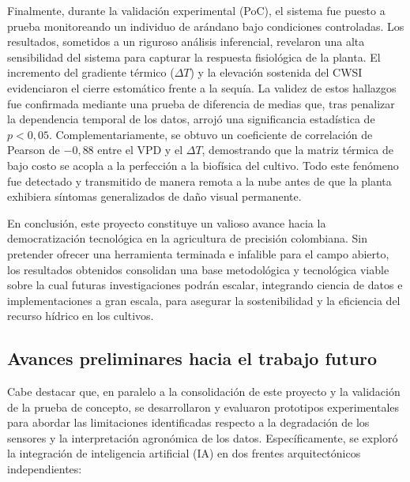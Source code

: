 Finalmente, durante la validación experimental (PoC), el sistema fue puesto a prueba monitoreando un individuo de arándano bajo condiciones controladas. Los resultados, sometidos a un riguroso análisis inferencial, revelaron una alta sensibilidad del sistema para capturar la respuesta fisiológica de la planta. El incremento del gradiente térmico ($\Delta T$) y la elevación sostenida del CWSI evidenciaron el cierre estomático frente a la sequía. La validez de estos hallazgos fue confirmada mediante una prueba de diferencia de medias que, tras penalizar la dependencia temporal de los datos, arrojó una significancia estadística de $p < 0,05$. Complementariamente, se obtuvo un coeficiente de correlación de Pearson de $-0,88$ entre el VPD y el $\Delta T$, demostrando que la matriz térmica de bajo costo se acopla a la perfección a la biofísica del cultivo. Todo este fenómeno fue detectado y transmitido de manera remota a la nube antes de que la planta exhibiera síntomas generalizados de daño visual permanente.

En conclusión, este proyecto constituye un valioso avance hacia la democratización tecnológica en la agricultura de precisión colombiana. Sin pretender ofrecer una herramienta terminada e infalible para el campo abierto, los resultados obtenidos consolidan una base metodológica y tecnológica viable sobre la cual futuras investigaciones podrán escalar, integrando ciencia de datos e implementaciones a gran escala, para asegurar la sostenibilidad y la eficiencia del recurso hídrico en los cultivos.

\subsection{Avances preliminares hacia el trabajo futuro}
\label{subsec:avances_preliminares}

Cabe destacar que, en paralelo a la consolidación de este proyecto y la validación de la prueba de concepto, se desarrollaron y evaluaron prototipos experimentales para abordar las limitaciones identificadas respecto a la degradación de los sensores y la interpretación agronómica de los datos. Específicamente, se exploró la integración de inteligencia artificial (IA) en dos frentes arquitectónicos independientes:

